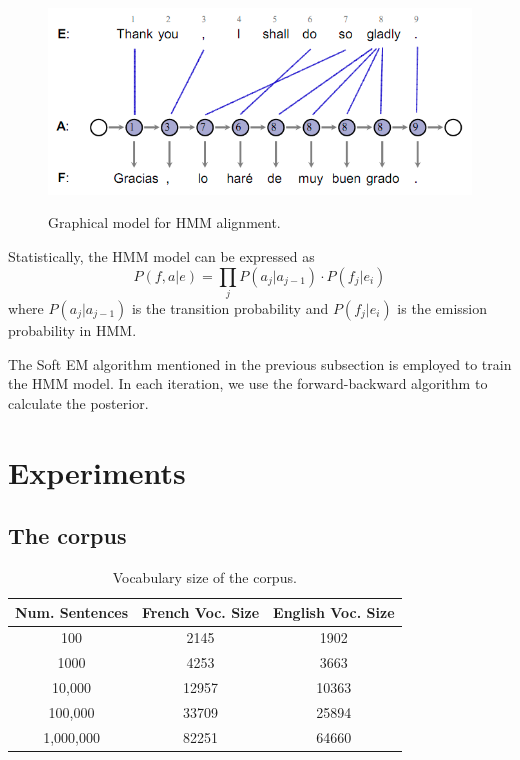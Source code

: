 \documentclass[12pt]{article}   %
\begin{document}
\begin{figure}[h*]
	\centering
	\includegraphics[width=0.7\linewidth]{hmm.png}
	\label{fig:hmm}
	\caption{Graphical model for HMM alignment.}
\end{figure}

Statistically, the HMM model can be expressed as
$$ P(f,a|e) = \prod_j P(a_j|a_{j-1}) \cdot P(f_j|e_i) $$
where $P(a_j|a_{j-1})$ is the transition probability and $P(f_j|e_i)$ is the emission probability in HMM.

The Soft EM algorithm mentioned in the previous subsection is employed to train the HMM model. In each iteration, we use the forward-backward algorithm \cite{forward-backward} to calculate the posterior.


\section{Experiments}
\label{sec:exp}


\subsection{The corpus}

\begin{table}
\centering
\begin{tabular}{ c | c | c  }
	Num. Sentences & French Voc. Size & English Voc. Size \\
	\hline
	100 & 2145 & 1902 \\
	1000 & 4253 & 3663 \\
	10,000 & 12957 & 10363 \\
	100,000 & 33709 & 25894 \\
	1,000,000 & 82251 & 64660 \\
\end{tabular}
\caption{Vocabulary size of the corpus.}
\label{tbl:corpus}
\end{table}
\end{document}
